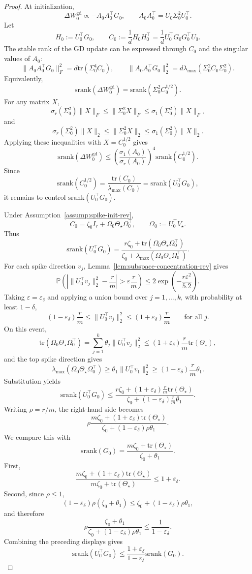 \documentclass[10pt,a4paper]{amsart}
\newcommand{\srank}{\mathrm{srank}}
\newcommand{\tr}{\mathrm{tr}}
\begin{document}
\begin{proof}
At initialization,
\[
\Delta W_0^{\mathrm{gd}}\propto -A_0A_0^\top G_0,
\qquad
A_0A_0^\top=U_0\Sigma_0^2U_0^\top.
\]
Let
\[
H_0:=U_0^\top G_0,
\qquad
C_0:=\frac{1}{d}H_0H_0^\top
=
\frac{1}{d}U_0^\top G_0G_0^\top U_0.
\]
The stable rank of the GD update can be expressed through \(C_0\) and the singular values of \(A_0\):
\[
\|A_0A_0^\top G_0\|_F^2
=
d\tr(\Sigma_0^4C_0),
\qquad
\|A_0A_0^\top G_0\|_2^2
=
d\lambda_{\max}(\Sigma_0^2C_0\Sigma_0^2).
\]
Equivalently,
\[
\srank(\Delta W_0^{\mathrm{gd}})
=
\srank(\Sigma_0^2C_0^{1/2}).
\]
For any matrix \(X\),
\[
\sigma_r(\Sigma_0^2)\|X\|_F
\le
\|\Sigma_0^2X\|_F
\le
\sigma_1(\Sigma_0^2)\|X\|_F,
\]
and
\[
\sigma_r(\Sigma_0^2)\|X\|_2
\le
\|\Sigma_0^2X\|_2
\le
\sigma_1(\Sigma_0^2)\|X\|_2.
\]
Applying these inequalities with \(X=C_0^{1/2}\) gives
\[
\srank(\Delta W_0^{\mathrm{gd}})
\le
\left(\frac{\sigma_1(A_0)}{\sigma_r(A_0)}\right)^4
\srank(C_0^{1/2}).
\]
Since
\[
\srank(C_0^{1/2})
=
\frac{\tr(C_0)}{\lambda_{\max}(C_0)}
=
\srank(U_0^\top G_0),
\]
it remains to control \(\srank(U_0^\top G_0)\).

Under Assumption~\ref{assump:spike-init-rev},
\[
C_0=\zeta_0I_r+\Omega_0\Theta_\star\Omega_0^\top,
\qquad
\Omega_0:=U_0^\top V_\star.
\]
Thus
\[
\srank(U_0^\top G_0)
=
\frac{r\zeta_0+\tr(\Omega_0\Theta_\star\Omega_0^\top)}{\zeta_0+\lambda_{\max}(\Omega_0\Theta_\star\Omega_0^\top)}.
\]
For each spike direction \(v_j\), Lemma~\ref{lem:subspace-concentration-rev} gives
\[
\mathbb P\left(
\left|\|U_0^\top v_j\|_2^2-\frac{r}{m}\right|
>
\varepsilon\frac{r}{m}
\right)
\le
2\exp\left(-\frac{r\varepsilon^2}{5.2}\right).
\]
Taking \(\varepsilon=\varepsilon_\delta\) and applying a union bound over \(j=1,\ldots,k\), with probability at least \(1-\delta\),
\[
(1-\varepsilon_\delta)\frac{r}{m}
\le
\|U_0^\top v_j\|_2^2
\le
(1+\varepsilon_\delta)\frac{r}{m}
\qquad
\text{for all }j.
\]
On this event,
\[
\tr(\Omega_0\Theta_\star\Omega_0^\top)
=
\sum_{j=1}^k\theta_j\|U_0^\top v_j\|_2^2
\le
(1+\varepsilon_\delta)\frac{r}{m}\tr(\Theta_\star),
\]
and the top spike direction gives
\[
\lambda_{\max}(\Omega_0\Theta_\star\Omega_0^\top)
\ge
\theta_1\|U_0^\top v_1\|_2^2
\ge
(1-\varepsilon_\delta)\frac{r}{m}\theta_1.
\]
Substitution yields
\[
\srank(U_0^\top G_0)
\le
\frac{r\zeta_0+(1+\varepsilon_\delta)\frac{r}m\tr(\Theta_\star)}{\zeta_0+(1-\varepsilon_\delta)\frac{r}m\theta_1}.
\]
Writing \(\rho=r/m\), the right-hand side becomes
\[
\rho
\frac{m\zeta_0+(1+\varepsilon_\delta)\tr(\Theta_\star)}{\zeta_0+(1-\varepsilon_\delta)\rho\theta_1}.
\]
We compare this with
\[
\srank(G_0)
=
\frac{m\zeta_0+\tr(\Theta_\star)}{\zeta_0+\theta_1}.
\]
First,
\[
\frac{m\zeta_0+(1+\varepsilon_\delta)\tr(\Theta_\star)}{m\zeta_0+\tr(\Theta_\star)}
\le
1+\varepsilon_\delta.
\]
Second, since \(\rho\le1\),
\[
(1-\varepsilon_\delta)\rho(\zeta_0+\theta_1)
\le
\zeta_0+(1-\varepsilon_\delta)\rho\theta_1,
\]
and therefore
\[
\rho
\frac{\zeta_0+\theta_1}{\zeta_0+(1-\varepsilon_\delta)\rho\theta_1}
\le
\frac{1}{1-\varepsilon_\delta}.
\]
Combining the preceding displays gives
\[
\srank(U_0^\top G_0)
\le
\frac{1+\varepsilon_\delta}{1-\varepsilon_\delta}\srank(G_0).
\]


\end{proof}
\end{document}
